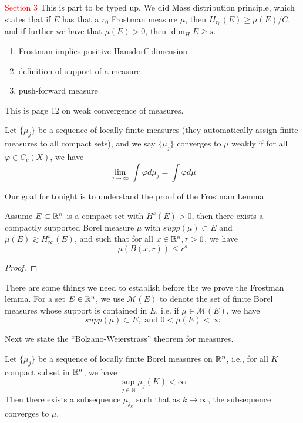 \textcolor{red}{Section 3}
This is part to be typed up. We did Mass distribution principle, which states that if $E$ has that a $r_0$ Frostman measure $\mu$, then $H_{r_0}(E)\geq\mu(E)/C$, and if further we have that $\mu(E)>0$, then $\dim_HE\geq s$.

\begin{enumerate}
    \item Frostman implies positive Hausdorff dimension
    \item definition of support of a measure 
    \item push-forward measure 
\end{enumerate}


This is page 12 on weak convergence of measures.
\begin{definition}
    Let $\{\mu_j\}$ be a sequence of locally finite measures (they automatically assign finite measures to all compact sets), and we say $\{\mu_j\}$ converges to $\mu$ weakly if for all $\varphi\in C_c(X)$, we have
    \begin{equation*}
        \lim_{j\to\infty}\int\varphi d\mu_j=\int \varphi d\mu
    \end{equation*}
\end{definition}

Our goal for tonight is to understand the proof of the Frostman Lemma.
\begin{lemma}
    Assume $E\subset\mathbb{R}^n$ is a compact set with $H^s(E)>0$, then there exists a compactly supported Borel measure $\mu$ with $supp(\mu)\subset E$ and $\mu(E)\gtrsim H_\infty^s(E)$, and such that for all $x\in\mathbb{R}^n, r>0$, we have
    \begin{equation*}
        \mu(B(x,r))\leq r^s
    \end{equation*}
\end{lemma}
\begin{proof}
    
\end{proof}

There are some things we need to establish before the we prove the Frostman lemma. For a set $E\in\mathbb{R}^n$, we use $\mathcal{M}(E)$ to denote the set of finite Borel measures whose support is contained in $E$, i.e. if $\mu\in\mathcal{M}(E)$, we have
\begin{equation*}
    supp(\mu)\subset E, \text{ and }0<\mu(E)<\infty
\end{equation*}

Next we state the ``Bolzano-Weierstrass'' theorem for measures.
\begin{lemma}
    Let $\{\mu_j\}$ be a sequence of locally finite Borel measures on $\mathbb{R}^n$, i.e., for all $K$ compact subset in $\mathbb{R}^n$, we have
    \begin{equation*}
        \sup_{j\in\mathbb{N}}\mu_j(K)<\infty
    \end{equation*}
    Then there exists a subsequence $\mu_{j_k}$ such that as $k\to\infty$, the subsequence converges to $\mu$.
\end{lemma}


